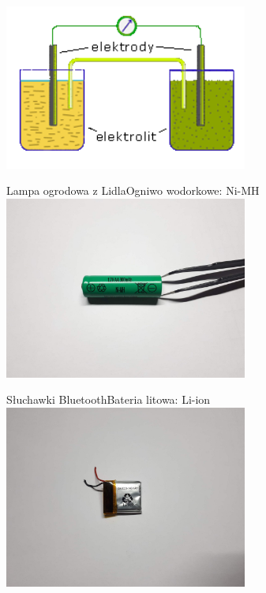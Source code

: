 \documentclass[
	11pt, %
]{beamer}
\begin{document}
\begin{frame}
	\centering
  \includegraphics[width=8cm]{ogniwo.png}
\end{frame}

\begin{frame}{Lampa ogrodowa z Lidla}{Ogniwo wodorkowe: Ni-MH}
  \centering
  \includegraphics[width=8cm]{solar-lamp.jpg}
	

\end{frame}

\begin{frame}{Słuchawki Bluetooth}{Bateria litowa: Li-ion}
  \centering
  \includegraphics[width=8cm]{earbuds.jpg}
	
\end{frame}
\end{document}
